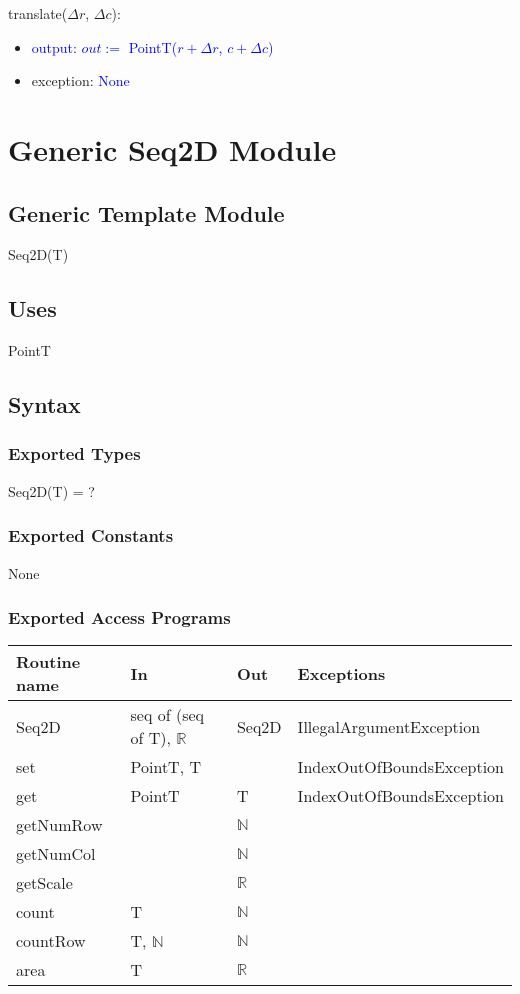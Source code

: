 \documentclass[12pt]{article}
\begin{document}
\noindent translate($\Delta r$, $\Delta c$):
\begin{itemize}
\item \textcolor{blue}{output: $out :=$ PointT($r + \Delta r$, $c + \Delta c$)}
\item exception: \textcolor{blue}{None}
\end{itemize}

\newpage

\section* {Generic Seq2D Module}

\subsection* {Generic Template Module}

Seq2D(T)

\subsection* {Uses}

PointT

\subsection* {Syntax}

\subsubsection* {Exported Types}

Seq2D(T) = ?

\subsubsection* {Exported Constants}

None

\subsubsection* {Exported Access Programs}

\begin{tabular}{| l | l | l | p{6cm} |}
\hline
\textbf{Routine name} & \textbf{In} & \textbf{Out} & \textbf{Exceptions}\\
\hline
Seq2D & seq of (seq of T), $\mathbb{R}$ & Seq2D & IllegalArgumentException\\
\hline
set & PointT, T & ~ & IndexOutOfBoundsException\\
\hline
get & PointT & T & IndexOutOfBoundsException\\
\hline
getNumRow & ~ & $\mathbb{N}$ & \\
\hline
getNumCol & ~ & $\mathbb{N}$ & \\
\hline
getScale & ~ & $\mathbb{R}$ & \\
\hline
count & T & $\mathbb{N}$ & \\
\hline
countRow & T, $\mathbb{N}$ & $\mathbb{N}$ & \\
\hline
area & T & $\mathbb{R}$ & \\
\hline
\end{tabular}
\end{document}
